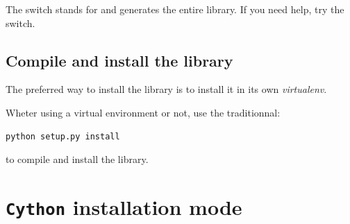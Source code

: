 \documentclass[letterpaper,10pt,english]{sphinxmanual}
\begin{document}
The switch  stands for  and generates the entire library. If you need help, try the  switch.


\subsection{Compile and install the library}
\label{installation:compile-and-install-the-library}
The preferred way to install the library is to install it in its own \emph{virtualenv}.

Wheter using a virtual environment or not, use the traditionnal:

\begin{Verbatim}[commandchars=\\\{\}]
python setup.py install
\end{Verbatim}

to compile and install the library.


\section{\textbf{\texttt{Cython}} installation mode}
\label{installation:cython-installation-mode}
\end{document}
